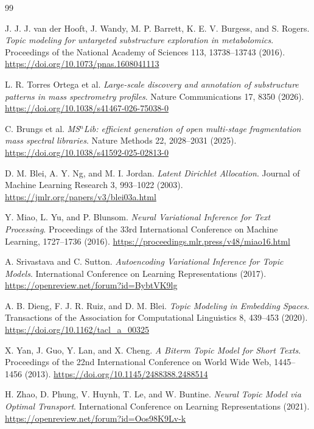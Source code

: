 \documentclass[10pt,a4paper]{article}
\begin{document}
\begin{thebibliography}{99}

J. J. J. van der Hooft, J. Wandy, M. P. Barrett, K. E. V. Burgess, and
S. Rogers. \emph{Topic modeling for untargeted substructure exploration in
metabolomics}. Proceedings of the National Academy of Sciences 113,
13738--13743 (2016).
\url{https://doi.org/10.1073/pnas.1608041113}

L. R. Torres Ortega et al. \emph{Large-scale discovery and annotation of
substructure patterns in mass spectrometry profiles}.
Nature Communications 17, 8350 (2026).
\url{https://doi.org/10.1038/s41467-026-75038-0}

C. Brungs et al. \emph{MS$^{n}$Lib: efficient generation of open multi-stage
fragmentation mass spectral libraries}. Nature Methods 22,
2028--2031 (2025).
\url{https://doi.org/10.1038/s41592-025-02813-0}

D. M. Blei, A. Y. Ng, and M. I. Jordan. \emph{Latent Dirichlet Allocation}.
Journal of Machine Learning Research 3, 993--1022 (2003).
\url{https://jmlr.org/papers/v3/blei03a.html}

Y. Miao, L. Yu, and P. Blunsom. \emph{Neural Variational Inference for Text
Processing}. Proceedings of the 33rd International Conference on Machine
Learning, 1727--1736 (2016).
\url{https://proceedings.mlr.press/v48/miao16.html}

A. Srivastava and C. Sutton. \emph{Autoencoding Variational Inference for Topic
Models}. International Conference on Learning Representations (2017).
\url{https://openreview.net/forum?id=BybtVK9lg}

A. B. Dieng, F. J. R. Ruiz, and D. M. Blei. \emph{Topic Modeling in Embedding
Spaces}. Transactions of the Association for Computational Linguistics 8,
439--453 (2020).
\url{https://doi.org/10.1162/tacl_a_00325}

X. Yan, J. Guo, Y. Lan, and X. Cheng. \emph{A Biterm Topic Model for Short
Texts}. Proceedings of the 22nd International Conference on World Wide Web,
1445--1456 (2013).
\url{https://doi.org/10.1145/2488388.2488514}

H. Zhao, D. Phung, V. Huynh, T. Le, and W. Buntine. \emph{Neural Topic Model
via Optimal Transport}. International Conference on Learning Representations
(2021).
\url{https://openreview.net/forum?id=Oos98K9Lv-k}


\end{thebibliography}
\end{document}
